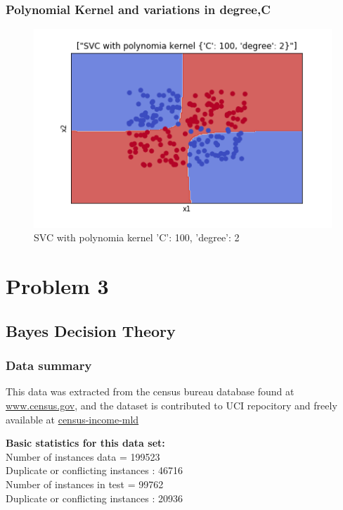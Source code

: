 \documentclass[10pt,a4paper]{article}
\begin{document}
\subsubsection*{Polynomial Kernel and variations in degree,C}
\begin{figure}[!h]
\includegraphics[scale=0.75]{images/P2/polyd2c100.png}
  \caption{SVC with polynomia kernel {'C': 100, 'degree': 2}}
  \label{fig:poly_kerE1}
\end{figure}

\clearpage

\section{Problem 3}
\subsection{ Bayes Decision Theory}
\subsubsection{Data summary}
This data was extracted from the census bureau database found at
\href{http://www.census.gov/ftp/pub/DES/www/welcome.html}{www.census.gov}, and the dataset is contributed to UCI repocitory and freely available at \href{http://archive.ics.uci.edu/ml/machine-learning-databases/census-income-mld/}{census-income-mld} 

 \textbf{Basic statistics for this data set:}\\
 Number of instances data = 199523\\
    Duplicate or conflicting instances : 46716\\
 Number of instances in test = 99762\\
    Duplicate or conflicting instances : 20936\\
    
\end{document}
